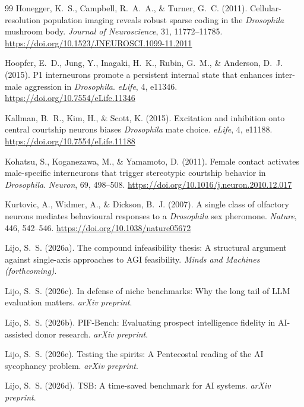 \documentclass[11pt,a4paper]{article}
\begin{document}
\begin{thebibliography}{99}
Honegger, K.~S., Campbell, R.~A.~A., \& Turner, G.~C. (2011). Cellular-resolution population imaging reveals robust sparse coding in the \emph{Drosophila} mushroom body. \emph{Journal of Neuroscience}, 31, 11772--11785. \url{https://doi.org/10.1523/JNEUROSCI.1099-11.2011}

Hoopfer, E.~D., Jung, Y., Inagaki, H.~K., Rubin, G.~M., \& Anderson, D.~J. (2015). P1 interneurons promote a persistent internal state that enhances inter-male aggression in \emph{Drosophila}. \emph{eLife}, 4, e11346. \url{https://doi.org/10.7554/eLife.11346}

Kallman, B.~R., Kim, H., \& Scott, K. (2015). Excitation and inhibition onto central courtship neurons biases \emph{Drosophila} mate choice. \emph{eLife}, 4, e11188. \url{https://doi.org/10.7554/eLife.11188}

Kohatsu, S., Koganezawa, M., \& Yamamoto, D. (2011). Female contact activates male-specific interneurons that trigger stereotypic courtship behavior in \emph{Drosophila}. \emph{Neuron}, 69, 498--508. \url{https://doi.org/10.1016/j.neuron.2010.12.017}

Kurtovic, A., Widmer, A., \& Dickson, B.~J. (2007). A single class of olfactory neurons mediates behavioural responses to a \emph{Drosophila} sex pheromone. \emph{Nature}, 446, 542--546. \url{https://doi.org/10.1038/nature05672}

Lijo, S.~S. (2026a). The compound infeasibility thesis: A structural argument against single-axis approaches to AGI feasibility. \emph{Minds and Machines (forthcoming)}.

Lijo, S.~S. (2026c). In defense of niche benchmarks: Why the long tail of LLM evaluation matters. \emph{arXiv preprint}.

Lijo, S.~S. (2026b). PIF-Bench: Evaluating prospect intelligence fidelity in AI-assisted donor research. \emph{arXiv preprint}.

Lijo, S.~S. (2026e). Testing the spirits: A Pentecostal reading of the AI sycophancy problem. \emph{arXiv preprint}.

Lijo, S.~S. (2026d). TSB: A time-saved benchmark for AI systems. \emph{arXiv preprint}.


\end{thebibliography}
\end{document}
